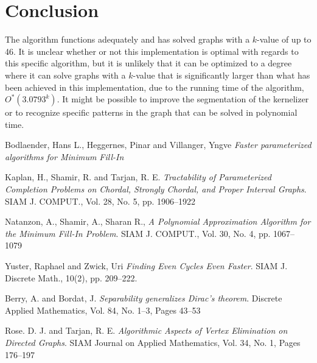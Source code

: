 \documentclass{article}
\begin{document}
	\section{Conclusion}
	The algorithm functions adequately and has solved graphs with a $k$-value of up to 46.
	It is unclear whether or not this implementation is optimal with regards to this specific algorithm, but it is unlikely that it can be optimized to a degree where it can solve graphs with a $k$-value that is significantly larger than what has been achieved in this implementation, due to the running time of the algorithm, $O^*(3.0793^k)$.
	It might be possible to improve the segmentation of the kernelizer or to recognize specific patterns in the graph that can be solved in polynomial time.

	\pagebreak
	
	\begin{thebibliography}{9}

		Bodlaender, Hans L., Heggernes, Pinar and Villanger, Yngve
		\textit{Faster parameterized algorithms for Minimum Fill-In}

		Kaplan, H., Shamir, R. and Tarjan, R. E. 
		\textit{Tractability of Parameterized Completion Problems on Chordal, Strongly Chordal, and Proper Interval Graphs}. 
		SIAM J. COMPUT., Vol. 28, No. 5, pp. 1906--1922

		Natanzon, A., Shamir, A., Sharan R.,
		\textit{A Polynomial Approximation Algorithm for the Minimum Fill-In Problem}. 
 		SIAM J. COMPUT., Vol. 30, No. 4, pp. 1067--1079

		Yuster, Raphael and Zwick, Uri
		\textit{Finding Even Cycles Even Faster}.
		SIAM J. Discrete Math., 10(2), pp. 209--222.

		Berry, A. and Bordat, J. 
		\textit{Separability generalizes Dirac’s theorem}.
		Discrete Applied Mathematics, Vol. 84, No. 1–3, Pages 43--53

		Rose. D. J. and Tarjan, R. E.  
		\textit{Algorithmic Aspects of Vertex Elimination on Directed Graphs}.
		SIAM Journal on Applied Mathematics, Vol. 34, No. 1, Pages 176--197
	\end{thebibliography}

	\clearpage
\end{document}

